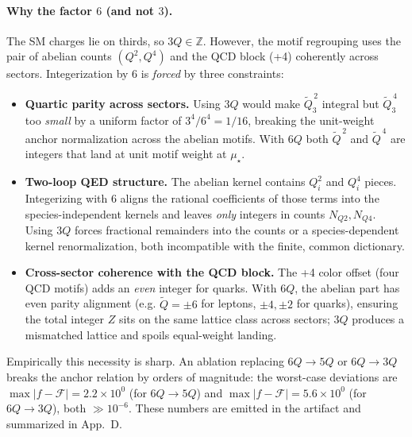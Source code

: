 \documentclass[epjc3]{svjour3}
\begin{document}
\paragraph{Why the factor $6$ (and not $3$).}
The SM charges lie on thirds, so $3Q\in\mathbb Z$. However, the motif regrouping uses the pair of abelian counts $(Q^2, Q^4)$ and the QCD block (+4) coherently across sectors. Integerization by $6$ is \emph{forced} by three constraints:
\begin{itemize}
  \item \textbf{Quartic parity across sectors.} Using $3Q$ would make $\tilde Q_3^{\,2}$ integral but $\tilde Q_3^{\,4}$ too \emph{small} by a uniform factor of $3^4/6^4=1/16$, breaking the unit-weight anchor normalization across the abelian motifs. With $6Q$ both $\tilde Q^{\,2}$ and $\tilde Q^{\,4}$ are integers that land at unit motif weight at $\mu_\star$.
  \item \textbf{Two-loop QED structure.} The abelian kernel contains $Q_i^2$ and $Q_i^4$ pieces. Integerizing with $6$ aligns the rational coefficients of those terms into the species-independent kernels and leaves \emph{only} integers in counts $N_{Q2},N_{Q4}$. Using $3Q$ forces fractional remainders into the counts or a species-dependent kernel renormalization, both incompatible with the finite, common dictionary.
  \item \textbf{Cross-sector coherence with the QCD block.} The +4 color offset (four QCD motifs) adds an \emph{even} integer for quarks. With $6Q$, the abelian part has even parity alignment (e.g. $\tilde Q=\pm 6$ for leptons, $\pm 4, \pm 2$ for quarks), ensuring the total integer $Z$ sits on the same lattice class across sectors; $3Q$ produces a mismatched lattice and spoils equal-weight landing.
\end{itemize}
Empirically this necessity is sharp. An ablation replacing $6Q\to 5Q$ or $6Q\to 3Q$ breaks the anchor relation by orders of magnitude: the worst-case deviations are $\max|f-\mathcal F|=2.2\times 10^0$ (for $6Q\to5Q$) and $\max|f-\mathcal F|=5.6\times 10^0$ (for $6Q\to3Q$), both $\gg 10^{-6}$. These numbers are emitted in the artifact and summarized in App.~D. %
\end{document}
